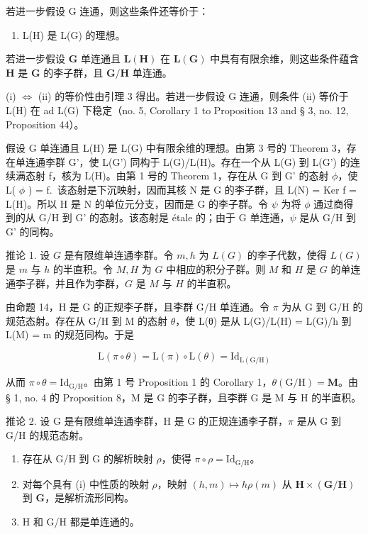 若进一步假设 G 连通，则这些条件还等价于：

\begin{enumerate}
\def\labelenumi{(\roman{enumi})}
\setcounter{enumi}{2}
\tightlist
\item
  L(H) 是 L(G) 的理想。
\end{enumerate}

若进一步假设 \(\mathbf{G}\) 单连通且 \(\mathbf{L}(\mathbf{H})\) 在 \(\mathbf{L}(\mathbf{G})\) 中具有有限余维，则这些条件蕴含 \(\mathbf{H}\) 是 \(\mathbf{G}\) 的李子群，且 \(\mathbf{G} / \mathbf{H}\) 单连通。

(i) \(\Leftrightarrow\) (ii) 的等价性由引理 3 得出。若进一步假设 G 连通，则条件 (ii) 等价于 L(H) 在 ad L(G) 下稳定（no. 5, Corollary 1 to Proposition 13 and § 3, no. 12, Proposition 44）。

假设 G 单连通且 L(H) 是 L(G) 中有限余维的理想。由第 3 号的 Theorem 3，存在单连通李群 G'，使 L(G') 同构于 L(G)/L(H)。存在一个从 L(G) 到 L(G') 的连续满态射 f，核为 L(H)。由第 1 号的 Theorem 1，存在从 G 到 G' 的态射 \(\phi\)，使 L( \(\phi\) ) = f.~该态射是下沉映射，因而其核 N 是 G 的李子群，且 L(N) = Ker f = L(H)。所以 H 是 N 的单位元分支，因而是 G 的李子群。令 \(\psi\) 为将 \(\phi\) 通过商得到的从 G/H 到 G' 的态射。该态射是 étale 的；由于 G 单连通，\(\psi\) 是从 G/H 到 G' 的同构。

推论 1. 设 \(G\) 是有限维单连通李群。令 \(m, h\) 为 \(L(G)\) 的李子代数，使得 \(L(G)\) 是 \(m\) 与 \(h\) 的半直积。令 \(M, H\) 为 \(G\) 中相应的积分子群。则 \(M\) 和 \(H\) 是 \(G\) 的单连通李子群，并且作为李群，\(G\) 是 \(M\) 与 \(H\) 的半直积。

由命题 14，H 是 G 的正规李子群，且李群 G/H 单连通。令 \(\pi\) 为从 G 到 G/H 的规范态射。存在从 G/H 到 M 的态射 \(\theta\)，使 L(θ) 是从 L(G)/L(H) = L(G)/h 到 L(M) = m 的规范同构。于是

\[
\mathrm{L} (\pi \circ \theta) = \mathrm{L} (\pi) \circ \mathrm{L} (\theta) = \mathrm{Id} _ {\mathrm{L} (\mathrm{G} / \mathrm{H})}
\]

从而 \(\pi \circ \theta = \mathrm{Id}_{\mathrm{G}/\mathrm{H}}\)。由第 1 号 Proposition 1 的 Corollary 1，\(\theta (\mathrm{G / H}) = \mathbf{M}\)。由 § 1, no. 4 的 Proposition 8，M 是 G 的李子群，且李群 G 是 M 与 H 的半直积。

推论 2. 设 G 是有限维单连通李群，H 是 G 的正规连通李子群，\(\pi\) 是从 G 到 G/H 的规范态射。

\begin{enumerate}
\def\labelenumi{(\roman{enumi})}
\item
  存在从 G/H 到 G 的解析映射 \(\rho\)，使得 \(\pi \circ \rho = \mathrm{Id}_{\mathrm{G / H}}\)。
\item
  对每个具有 (i) 中性质的映射 \(\rho\)，映射 \((h, m) \mapsto h\rho(m)\) 从 \(\mathbf{H} \times (\mathbf{G}/\mathbf{H})\) 到 \(\mathbf{G}\)，是解析流形同构。
\item
  H 和 G/H 都是单连通的。
\end{enumerate}

